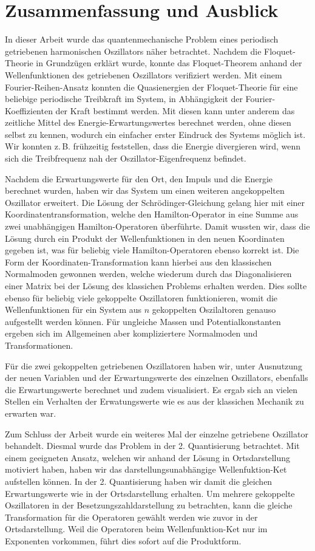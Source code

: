 \chapter{Zusammenfassung und Ausblick}
\label{6}
In dieser Arbeit wurde das quantenmechanische Problem eines periodisch getriebenen harmonischen Oszillators näher betrachtet.
Nachdem die Floquet-Theorie in Grundzügen erklärt wurde, konnte das Floquet-Theorem anhand der Wellenfunktionen des getriebenen Oszillators verifiziert werden.
Mit einem Fourier-Reihen-Ansatz konnten die Quasienergien der Floquet-Theorie für eine beliebige periodische Treibkraft im System, in Abhängigkeit der Fourier-Koeffizienten der Kraft bestimmt werden.
Mit diesen kann unter anderem das zeitliche Mittel des Energie-Erwartungswertes berechnet werden, ohne diesen selbst zu kennen, wodurch ein einfacher erster Eindruck des Systems möglich ist.
Wir konnten z.\,B. frühzeitig feststellen, dass die Energie divergieren wird, wenn sich die Treibfrequenz nah der Oszillator-Eigenfrequenz befindet.

Nachdem die Erwartungswerte für den Ort, den Impuls und die Energie berechnet wurden, haben wir das System um einen weiteren angekoppelten Oszillator erweitert.
Die Lösung der Schrödinger-Gleichung gelang hier mit einer Koordinatentransformation, welche den Hamilton-Operator in eine Summe aus zwei unabhängigen Hamilton-Operatoren überführte.
Damit wussten wir, dass die Lösung durch ein Produkt der Wellenfunktionen in den neuen Koordinaten gegeben ist, was für beliebig viele Hamilton-Operatoren ebenso korrekt ist.
Die Form der Koordinaten-Transformation kann hierbei aus den klassischen Normalmoden gewonnen werden, welche wiederum durch das Diagonalisieren einer Matrix bei der Lösung des klassichen Problems erhalten werden.
Dies sollte ebenso für beliebig viele gekoppelte Oszillatoren funktionieren, womit die Wellenfunktionen für ein System aus $n$ gekoppelten Oszilaltoren genauso aufgestellt werden können.
Für ungleiche Massen und Potentialkonstanten ergeben sich im Allgemeinen aber kompliziertere Normalmoden und Transformationen.

Für die zwei gekoppelten getriebenen Oszillatoren haben wir, unter Ausnutzung der neuen Variablen und der Erwartungswerte des einzelnen Oszillators, ebenfalls die Erwartungswerte berechnet und zudem visualisiert.
Es ergab sich an vielen Stellen ein Verhalten der Erwatungswerte wie es aus der klassichen Mechanik zu erwarten war.

Zum Schluss der Arbeit wurde ein weiteres Mal der einzelne getriebene Oszillator behandelt.
Diesmal wurde das Problem in der 2. Quantisierung betrachtet.
Mit einem geeigneten Ansatz, welchen wir anhand der Lösung in Ortsdarstellung motiviert haben, haben wir das darstellungsunabhängige Wellenfuktion-Ket aufstellen können.
In der 2. Quantisierung haben wir damit die gleichen Erwartungswerte wie in der Ortsdarstellung erhalten.
Um mehrere gekoppelte Oszillatoren in der Besetzungszahldarstellung zu betrachten, kann die gleiche Transformation für die Operatoren gewählt werden wie zuvor in der Ortsdarstellung.
Weil die Operatoren beim Wellenfunktion-Ket nur im Exponenten vorkommen, führt dies sofort auf die Produktform.

